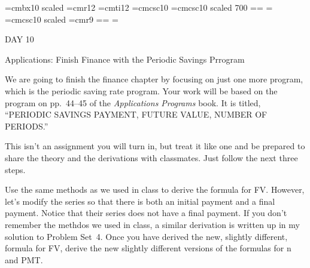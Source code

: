 
\def\folio{\ifnum\pageno>0 \number\pageno \else
   \ifnum\pageno<0 \romannumeral-\pageno \else\fi\fi}

\font\largebf=cmbx10  scaled 
\font\largerm=cmr12
\font\largeit=cmti12
\font\tensc=cmcsc10
\font\sevensc=cmcsc10 scaled 700
\newfam\scfam \def\sc{\fam\scfam\tensc}
\textfont\scfam=\tensc \scriptfont\scfam=\sevensc
\scriptscriptfont\scfam=\sevensc
\font\largesc=cmcsc10 scaled 
\font\ninerm=cmr9
\newfam\srfam \def\sr{\fam\srfam\ninerm}
\textfont\srfam=\ninerm \scriptfont\srfam=\sevenrm
\scriptscriptfont\srfam=\fiverm




\null\vskip36pt

\centerline{\largerm DAY 10}
\nobreak\bigskip

\centerline{\largeit Applications: Finish Finance with the Periodic Savings Prrogram}
\nobreak\bigskip

\nobreak\bigskip

\noindent  We are going to finish the finance chapter by focusing on just one more program, which is the periodic saving rate program. Your work will be based on the program on pp.~44--45 of the {\it Applications Programs} book. It is titled, ``PERIODIC SAVINGS
PAYMENT, FUTURE VALUE, NUMBER OF PERIODS.''
\bigskip

\nobreak\bigskip

\noindent This isn't an assignment you will turn in, but treat it like one and be prepared to share the theory and the derivations with classmates. Just follow the next three steps.
\bigskip


\bigskip

\noindent Use the same methods as we used in class to derive the formula for FV. However, let's modify the series so that there is both an initial payment and a final payment. Notice that their series does not have a final payment. If you don't remember the methdos we used in class, a similar derivation is written up in my solution to Problem Set~4. Once you have derived the new, slightly different, formula for FV, derive the new slightly different versions of the formulas for n and PMT.

\bigskip

\nobreak\bigskip

